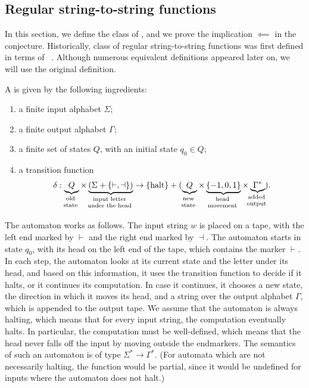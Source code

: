 \subsection{Regular string-to-string functions}
\label{sec:regular-string-to-string-functions}
\AP
In this section, we define the class of , and
we prove the implication $\impliedby$ in the conjecture. Historically, class of
regular string-to-string  functions was first defined in terms of ~\cite[Note 4]{shepherdson1959reduction}. Although
numerous equivalent definitions appeared later on, we will use the original
definition.

 \begin{definition}
   \AP
   A  is
   given by the following ingredients:
    \begin{enumerate}
        \item a finite input alphabet $\Sigma$;
        \item a finite output alphabet $\Gamma$;
        \item a finite set of states $Q$, with an initial state $q_0 \in Q$;
        \item a transition function  
        \begin{align*}
        \delta : 
        \myunderbrace{Q}{old \\ state} \times 
        \myunderbrace{(\Sigma + \{\vdash, \dashv\})}{input letter\\ under  the head} \to  \set{\text{halt}} + (
        \myunderbrace{Q}{new \\ state}
         \times 
         \myunderbrace{\{-1,0,1\}}{head \\ movement} \times 
         \myunderbrace{\Gamma^*}{added \\ output}) .
        \end{align*}
    \end{enumerate}
 \end{definition}

\AP
The automaton works as follows. The input string $w$ is placed on a tape,
with the left end marked by $\vdash$ and the right end marked by $\dashv$.
The automaton starts in state $q_0$, with its head on the left end of the
tape, which contains the marker $\vdash$. In each step, the automaton looks
at its current state and the letter under its head, and based on this
information, it uses the transition function to decide if it halts, or it
continues its computation. In case it continues, it chooses a  new state,
the direction in which it moves its head, and a string over the output
alphabet $\Gamma$, which is appended to the output tape. We assume that the
automaton is always halting, which means that for every input string, the
computation eventually halts. In particular, the computation must be
well-defined, which means that the head never falls off the input by moving
outside the endmarkers.   The semantics of such an automaton is of type
$\Sigma^* \to \Gamma^*$. (For automata which are not necessarily halting,
the function would be partial, since it would be undefined for inputs where
the automaton does not halt.)

